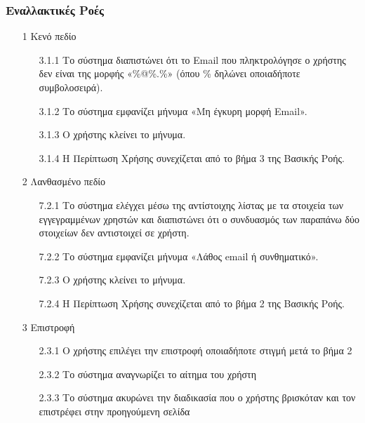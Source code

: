 \documentclass[12pt,a4paper,twoside]{book}
\begin{document}
\subsubsection{Εναλλακτικές Ροές}
\begin{enumerate}
  \item[1 ] Κενό πεδίο  %
        \begin{enumerate}
          \item[3.1.1 ] Το σύστημα διαπιστώνει ότι το Email που πληκτρολόγησε ο χρήστης δεν είναι της μορφής «\%@\%.\%» (όπου \% δηλώνει οποιαδήποτε συμβολοσειρά). %
          \item[3.1.2 ] Το σύστημα εμφανίζει μήνυμα «Μη έγκυρη μορφή Email». %
          \item[3.1.3 ] Ο χρήστης κλείνει το μήνυμα. %
          \item[3.1.4 ] Η Περίπτωση Χρήσης συνεχίζεται από το βήμα 3 της Βασικής Ροής. %
        \end{enumerate}
  \item[2 ] Λανθασμένο πεδίο %
        \begin{enumerate}
          \item[7.2.1 ] Το σύστημα ελέγχει μέσω της αντίστοιχης λίστας με τα στοιχεία των εγγεγραμμένων χρηστών και διαπιστώνει ότι ο συνδυασμός των παραπάνω δύο στοιχείων δεν αντιστοιχεί σε χρήστη. %
          \item[7.2.2 ] Το σύστημα εμφανίζει μήνυμα «Λάθος email ή συνθηματικό».  %
          \item[7.2.3 ] Ο χρήστης κλείνει το μήνυμα.%
          \item[7.2.4 ] Η Περίπτωση Χρήσης συνεχίζεται από το βήμα 2 της Βασικής Ροής. %
        \end{enumerate}
  \item[3 ] Επιστροφή
        \begin{enumerate}
          \item[2.3.1 ] Ο χρήστης επιλέγει την επιστροφή οποιαδήποτε στιγμή μετά το βήμα 2 %
          \item[2.3.2 ] Το σύστημα αναγνωρίζει το αίτημα του χρήστη %
          \item[2.3.3 ] Το σύστημα ακυρώνει την διαδικασία που ο χρήστης βρισκόταν και τον επιστρέφει στην προηγούμενη σελίδα %
        \end{enumerate}
\end{enumerate}
\end{document}
